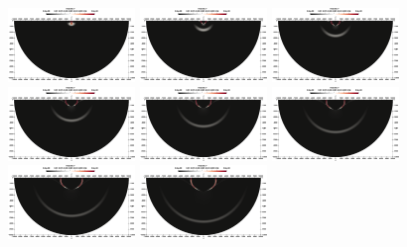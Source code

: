 \documentclass{report}
\begin{document}
\begin{figure}
    \centering
    \includegraphics[width=0.3\textwidth]{./Images/t1-large.png}        \includegraphics[width=0.3\textwidth]{./Images/t2-large.png}    
    \includegraphics[width=0.3\textwidth]{./Images/t3-large.png}\\
    \includegraphics[width=0.3\textwidth]{./Images/t5-large.png}        \includegraphics[width=0.3\textwidth]{./Images/t6-large.png}    
    \includegraphics[width=0.3\textwidth]{./Images/t7-large.png}\\
    \includegraphics[width=0.3\textwidth]{./Images/t8-large.png}        \includegraphics[width=0.3\textwidth]{./Images/t9-large.png}    

\end{figure}
\end{document}
